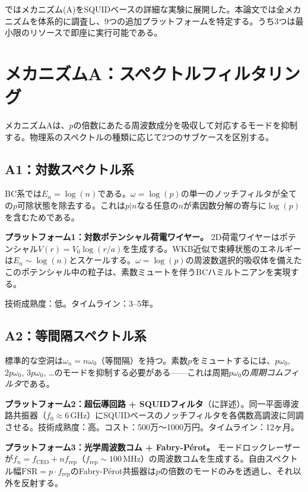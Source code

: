 \documentclass[11pt,a4paper]{article}
\begin{document}
\cite{paper_A}ではメカニズム(A)をSQUIDベースの詳細な実験に展開した。本論文では全メカニズムを体系的に調査し、9つの追加プラットフォームを特定する。うち3つは最小限のリソースで即座に実行可能である。

\section{メカニズムA：スペクトルフィルタリング}
\label{sec:mech_a}

メカニズムAは、$p$の倍数にあたる周波数成分を吸収して対応するモードを抑制する。物理系のスペクトルの種類に応じて2つのサブケースを区別する。

\subsection{A1：対数スペクトル系}

BC系では$E_n = \log(n)$である。$\omega = \log(p)$の単一のノッチフィルタが全ての$p$可除状態を除去する。これは$p|n$なる任意の$n$が素因数分解の寄与に$\log(p)$を含むためである。

\textbf{プラットフォーム1：対数ポテンシャル荷電ワイヤー。}
2D荷電ワイヤーはポテンシャル$V(r) = V_0\log(r/a)$を生成する。WKB近似で束縛状態のエネルギーは$E_n \sim \log(n)$とスケールする。$\omega = \log(p)$の周波数選択的吸収体を備えたこのポテンシャル中の粒子は、素数ミュートを伴うBCハミルトニアンを実現する。

技術成熟度：低。タイムライン：3--5年。

\subsection{A2：等間隔スペクトル系}

標準的な空洞は$\omega_n = n\omega_0$（等間隔）を持つ。素数$p$をミュートするには、$p\omega_0$, $2p\omega_0$, $3p\omega_0$, …のモードを抑制する必要がある——これは周期$p\omega_0$の\emph{周期コムフィルタ}である。

\textbf{プラットフォーム2：超伝導回路 + SQUIDフィルタ}（\cite{paper_A}に詳述）。同一平面導波路共振器（$f_0 \approx 6$\,GHz）にSQUIDベースのノッチフィルタを各偶数高調波に同調させる。技術成熟度：高。コスト：500万〜1000万円。タイムライン：12ヶ月。

\textbf{プラットフォーム3：光学周波数コム + Fabry-P\'{e}rot。}
モードロックレーザーが$f_n = f_{\mathrm{CEO}} + n f_{\mathrm{rep}}$（$f_{\mathrm{rep}} \sim 100$\,MHz）の周波数コムを生成する。自由スペクトル幅$\mathrm{FSR} = p \cdot f_{\mathrm{rep}}$のFabry-P\'{e}rot共振器は$p$の倍数のモードのみを透過し、それ以外を反射する。
\end{document}
